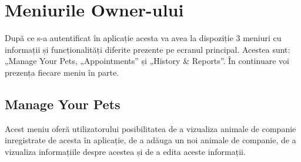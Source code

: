 \section{Meniurile Owner-ului}


După ce s-a autentificat în aplicație acesta va avea la dispoziție 3 meniuri cu informații și funcționalități diferite prezente pe ecranul principal. Acestea sunt: „Manage Your Pets, „Appointments” și „History \& Reports”. În continuare voi prezența fiecare meniu în parte. 

\subsection{Manage Your Pets}

Acest meniu oferă utilizatorului posibilitatea de a vizualiza  animale de companie inregistrate de acesta în aplicație, de a adăuga un noi animale de companie, de a vizualiza informațiile despre acestea și de a edita aceste informații.

